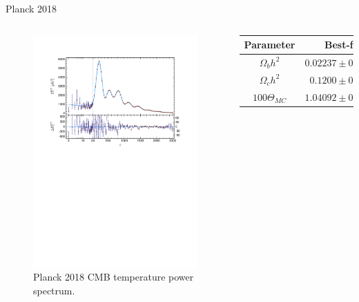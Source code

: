 \documentclass[serif, aspectratio=169]{beamer}
\begin{document}
\begin{frame}{Planck 2018}
    \begin{columns}
        \begin{figure}
            \centering
            \includegraphics[width=\linewidth]{pic/planck_spectrum.pdf}
            \caption{Planck 2018 CMB temperature power spectrum.}
            \label{fig:planck_spectrum}
        \end{figure}
        \begin{table}[!htb]
    \centering
    \begin{tabular}{cc} \hline
     Parameter & Best-fit \\ \hline
     $\Omega_b h^2$ & $0.02237\pm 0.00015$\\
     $\Omega_c h^2$ & $0.1200\pm 0.0012$\\
     $100\Theta_{MC}$ & $1.04092\pm 0.00031$ \\

\end{tabular}
\end{table}
\end{columns}
\end{frame}
\end{document}
